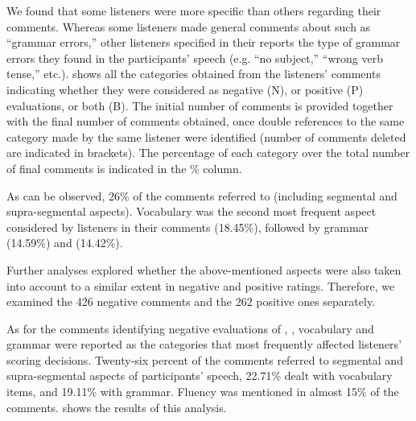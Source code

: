 \documentclass[output=paper]{langsci/langscibook}
\begin{document}
\largerpage
We found that some listeners were more specific than others regarding their comments. Whereas some listeners made general comments about  such as “grammar errors,” other listeners specified in their reports the type of grammar errors they found in the participants’ speech (e.g. “no subject,” “wrong verb tense,” etc.).  shows all the categories obtained from the listeners’ comments indicating whether they were considered as negative (N), or positive (P) evaluations, or both (B). The initial number of comments is provided together with the final number of comments obtained, once double references to the same category made by the same listener were identified (number of comments deleted are indicated in brackets). The percentage of each category over the total number of final comments is indicated in the \% column.


  

As can be observed, 26\% of the comments referred to  (including segmental and supra-segmental aspects). Vocabulary was the second most frequent aspect considered by listeners in their comments (18.45\%), followed by grammar (14.59\%) and  (14.42\%).  

Further analyses explored whether the above-mentioned aspects were also taken into account to a similar extent in negative and positive  ratings. Therefore, we examined the 426 negative comments and the 262 positive ones separately.

As for the comments identifying negative evaluations of , , vocabulary and grammar were reported as the categories that most frequently affected listeners’ scoring decisions. Twenty-six percent of the comments referred to segmental and supra-segmental aspects of participants’ speech, 22.71\% dealt with vocabulary items, and 19.11\% with grammar. Fluency was mentioned in almost 15\% of the comments.  shows the results of this analysis.
\end{document}
